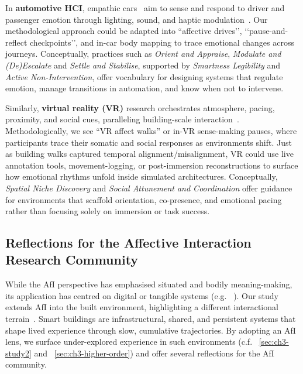 In \textbf{automotive HCI}, empathic cars~\cite{rao2023affective, ghosh2022exploring} aim to sense and respond to driver and passenger emotion through lighting, sound, and haptic modulation~\cite{liu2021empathetic, nadri2022empathic}. Our methodological approach could be adapted into ``affective drives’’, ‘‘pause-and-reflect checkpoints’’, and in-car body mapping to trace emotional changes across journeys. Conceptually, practices such as \textit{Orient and Appraise}, \textit{Modulate and (De)Escalate} and \textit{Settle and Stabilise}, supported by \textit{Smartness Legibility} and \textit{Active Non-Intervention}, offer vocabulary for designing systems that regulate emotion, manage transitions in automation, and know when not to intervene.

Similarly, \textbf{virtual reality (VR)} research orchestrates atmosphere, pacing, proximity, and social cues, paralleling building-scale interaction~\cite{albarrak2023using, ahmadpour2025affectivevr}. Methodologically, we see ``VR affect walks'' or in-VR sense-making pauses, where participants trace their somatic and social responses as environments shift. Just as building walks captured temporal alignment/misalignment, VR could use live annotation tools, movement-logging, or post-immersion reconstructions to surface how emotional rhythms unfold inside simulated architectures. Conceptually, \textit{Spatial Niche Discovery} and \textit{Social Attunement and Coordination} offer guidance for environments that scaffold orientation, co-presence, and emotional pacing rather than focusing solely on immersion or task success.




\subsection{Reflections for the Affective Interaction Research Community}
\label{sec:ch3-disc-reflections-afi}
While the AfI perspective has emphasised situated and bodily meaning-making, its application has centred on digital or tangible systems (e.g. ~\cite{breazeal2001affective, zhou2024tangible}). Our study extends AfI into the built environment, highlighting a different interactional terrain~\cite{rao2025lessons}. Smart buildings are infrastructural, shared, and persistent systems that shape lived experience through slow, cumulative trajectories. By adopting an AfI lens, we surface under-explored experience in such environments (c.f. ~\autoref{sec:ch3-study2} and ~\autoref{sec:ch3-higher-order}) and offer several reflections for the AfI community.

